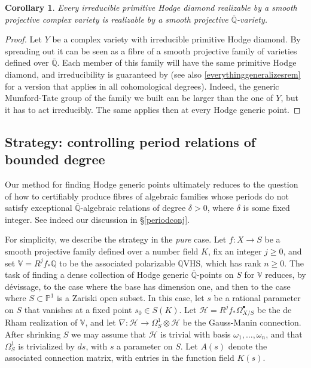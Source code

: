 \documentclass[10pt]{article}
\numberwithin{equation}{section}
\theoremstyle{plain}
\newtheorem{cor}[thm]{Corollary}
\theoremstyle{definition}
\theoremstyle{remark}
\newcommand{\Qbar}{\overline{\mathbb{Q}}}
\newcommand{\V}{\mathbb{V}}
\begin{document}
\begin{cor}
Every irreducible primitive Hodge diamond realizable by a smooth projective complex variety is realizable by a smooth projective $\Qbar$-variety.
\end{cor}
\begin{proof}
   Let $Y$ be a complex variety with irreducible primitive Hodge diamond. By spreading out it can be seen as a fibre of a smooth projective family of varieties defined over $\Qbar$. Each member of this family will have the same primitive Hodge diamond, and irreducibility is guaranteed by  (see also \autoref{everythinggeneralizesrem} for a version that applies in all cohomological degrees). Indeed, the generic Mumford-Tate group of the family we built can be larger than the one of $Y$, but it has to act irreducibly. The same applies then at every Hodge generic point.
\end{proof}

\subsection{Strategy: controlling period relations of bounded degree}
\label{strsec}

Our method for finding Hodge generic points ultimately reduces to the question of how to certifiably produce fibres of algebraic families whose periods do not satisfy exceptional $\Qbar$-algebraic relations of degree $\delta > 0$, where $\delta$ is some fixed integer. See indeed our discussion in \S\ref{periodconj}. 

For simplicity, we describe the strategy in the \emph{pure} case. Let $f : X \to S$ be a smooth projective family defined over a number field $K$, fix an integer $j \geq 0$, and set $\V = R^{j} f_{*} \mathbb{Q}$ to be the associated polarizable $\mathbb{Q}$VHS, which has rank $n \geq 0$. The task of finding a dense collection of Hodge generic $\Qbar$-points on $S$ for $\V$ reduces, by d\'evissage, to the case where the base has dimension one, and then to the case where $S \subset \mathbb{P}^1$ is a Zariski open subset. In this case, let $s$ be a rational parameter on $S$ that vanishes at a fixed point $s_{0} \in S(K)$. Let $\mathcal{H} = R^{j} f_{*} \Omega^{\bullet}_{X/S}$ be the de Rham realization of $\mathbb{V}$, and let $\nabla : \mathcal{H} \to \Omega^{1}_{S} \otimes \mathcal{H}$ be the Gauss-Manin connection. After shrinking $S$ we may assume that $\mathcal{H}$ is trivial with basis $\omega_{1}, \hdots, \omega_{n}$, and that $\Omega^{1}_{S}$ is trivialized by $ds$, with $s$ a parameter on $S$. Let $A(s)$ denote the associated connection matrix, with entries in the function field $K(s)$. 
\end{document}
